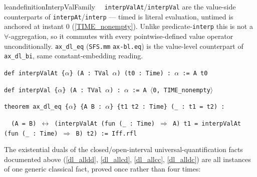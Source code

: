 \begin{restatable}{leandefinition}{InterpValFamily}~~ \texttt{interpValAt}/\texttt{interpVal} are the value-side counterparts of \texttt{interpAt}/\texttt{interp} --- timed is literal evaluation, untimed is anchored at instant $0$ (\ref{TIME_nonempty}). Unlike predicate-\texttt{interp} this is not a $\forall$-aggregation, so it commutes with every pointwise-defined value operator unconditionally. \texttt{ax\_dl\_eq} (\texttt{SFS.mm} \texttt{ax-bl.eq}) is the value-level counterpart of \texttt{ax\_dl\_bi}, same constant-embedding reading.

\texttt{\textcolor{leancolor}{def} \textcolor{leanyellow}{interpValAt} \{$\alpha$\} (A : TVal $\alpha$) (t0 : Time) : $\alpha$ := A t0}

\texttt{\textcolor{leancolor}{def} \textcolor{leanyellow}{interpVal} \{$\alpha$\} (A : TVal $\alpha$) : $\alpha$ := A $\langle$0, TIME\_nonempty$\rangle$}

\texttt{\textcolor{leancolor}{theorem} \textcolor{leanyellow}{ax\_dl\_eq} \{$\alpha$\} \{A B : $\alpha$\} \{t1 t2 : Time\} (\_ : t1 = t2) :}

\texttt{~~(A = B) $\leftrightarrow$ (interpValAt (\textcolor{leancolor}{fun} (\_ : Time) $\Rightarrow$ A) t1 = interpValAt (\textcolor{leancolor}{fun} (\_ : Time) $\Rightarrow$ B) t2) := Iff.rfl}
\label{interpValAt}
\label{interpVal}
\label{ax_dl_eq}
\end{restatable}

\pn The existential duals of the closed/open-interval universal-quantification facts documented above (\ref{dl_alldd}, \ref{dl_allcd}, \ref{dl_allcc}, \ref{dl_alldc}) are all instances of one generic classical fact, proved once rather than four times:

